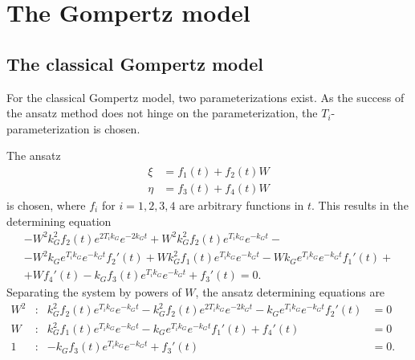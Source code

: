 \section{The Gompertz model}


\subsection{The classical Gompertz model}

For the classical Gompertz model, two parameterizations exist.
As the success of the ansatz method does not hinge on the parameterization, the \(T_i\)-parameterization is chosen.

The ansatz
\begin{align*}
  \xi &= f_{1}(t) + f_{2}(t) W \\
  \eta &= f_{3}(t) + f_{4}(t) W
\end{align*}
is chosen, where \(f_i\) for \(i =1,2,3,4\) are arbitrary functions in \(t\).
This results in the determining equation
\begin{multline*}
  - W^{2} k_{G}^{2} f_{2}{\left(t \right)} e^{2 T_{i} k_{G}} e^{- 2 k_{G} t} + W^{2} k_{G}^{2} f_{2}{\left(t \right)} e^{T_{i} k_{G}} e^{- k_{G} t} -\\- W^{2} k_{G} e^{T_{i} k_{G}} e^{- k_{G} t} f_{2}'{\left(t \right)} + W k_{G}^{2} f_{1}{\left(t \right)} e^{T_{i} k_{G}} e^{- k_{G} t} - W k_{G} e^{T_{i} k_{G}} e^{- k_{G} t} f_{1}'{\left(t \right)} +\\+ W f_{4}'{\left(t \right)} - k_{G} f_{3}{\left(t \right)} e^{T_{i} k_{G}} e^{- k_{G} t} + f_{3}'{\left(t \right)} = 0.
\end{multline*}
Separating the system by powers of \(W\), the ansatz determining equations are
\begin{subequations}
  \begin{flalign*}
    W^2 & : &  k_{G}^{2} f_{2}{\left(t \right)} e^{T_{i} k_{G}} e^{- k_{G} t} - k_{G}^{2} f_{2}{\left(t \right)} e^{2 T_{i} k_{G}} e^{- 2 k_{G} t} - k_{G} e^{T_{i} k_{G}} e^{- k_{G} t} f_{2}'{\left(t \right)} &= 0 &&\\
    W & : & k_{G}^{2} f_{1}{\left(t \right)} e^{T_{i} k_{G}} e^{- k_{G} t} - k_{G} e^{T_{i} k_{G}} e^{- k_{G} t} f_{1}'{\left(t \right)} + f_{4}'{\left(t \right)} &= 0 && \\
    1 & : & - k_{G} f_{3}{\left(t \right)} e^{T_{i} k_{G}} e^{- k_{G} t} + f_{3}'{\left(t \right)} &= 0. &&
  \end{flalign*}
\end{subequations}
